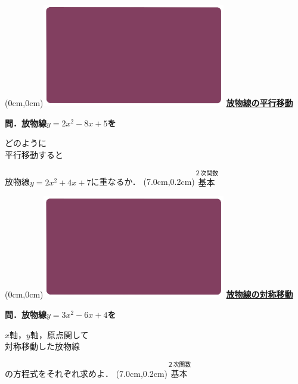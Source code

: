 \documentclass[10pt,
fleqn,
dvipdfmx,
uplatex
]{jsarticle}
\begin{document}
\at(0cm,0cm){\includegraphics[width=8cm,bb=0 0 1920 1080]{./youtube/thumbnails/templates/smart_background/２次関数.jpeg}}
{\color{orange}\bf\boldmath\huge\underline{放物線の平行移動}}\vspace{0.3zw}

\large
\bf\boldmath 問．放物線$y=2x^2-8x+5$を

\huge
\vspace{-0.1zw}
\hspace{0.1zw}
どのように\vspace{-0.1zw}\\
\hfill 平行移動すると
\vspace{0.2zw}
\hspace{0.1zw}

\large
\hfill 放物線$y=2x^2+4x+7$に重なるか．
\at(7.0cm,0.2cm){\small\color{bradorange}$\overset{\text{２次関数}}{\text{基本}}$}


\newpage



\at(0cm,0cm){\includegraphics[width=8cm,bb=0 0 1920 1080]{./youtube/thumbnails/templates/smart_background/２次関数.jpeg}}
{\color{orange}\bf\boldmath\huge\underline{放物線の対称移動}}\vspace{0.3zw}

\large 
\bf\boldmath 問．放物線$y=3x^2-6x+4$を

\LARGE
\hspace{0.1zw}
$x$軸，$y$軸，原点関して\\
\hfill 対称移動した放物線
\hspace{0.1zw}

\large
\vspace{0.5zw}
\hfill の方程式をそれぞれ求めよ．
\at(7.0cm,0.2cm){\small\color{bradorange}$\overset{\text{２次関数}}{\text{基本}}$}
\end{document}
